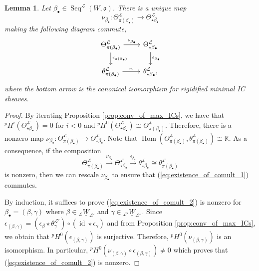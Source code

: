 \documentclass{amsart}
\newcommand{\K}{\mathbb{K}}
\newcommand{\scrL}{\mathcal{L}}
\DeclareMathOperator{\Hom}{Hom}
\DeclareMathOperator{\id}{id}
\newcommand{\fr}[1]{\mathfrak{#1}}
\DeclareMathOperator{\Seq}{Seq}
\newcommand{\uW}[2]{{}_{#1}\underline{W}_{#2}}
\newtheorem{lemma}[subsubsection]{Lemma}
\theoremstyle{definition}
\numberwithin{equation}{subsection}
\begin{document}
\begin{lemma}\label{lem:existence_of_comult}
    Let $\beta_{\bullet} \in \Seq^{\scrL} (W, \fr{o})$.
    There is a unique map
    \[\nu_{\beta_{\bullet}} : \Theta^{\scrL}_{\pi (\beta_{\bullet})} \to \Theta^{\scrL}_{\star \beta_{\bullet}}\]
    making the following diagram commute,
    \begin{equation}\label{eq:existence_of_comult_1}
        \begin{tikzcd}
            \Theta^{\scrL}_{\pi (\beta_{\bullet})} \arrow[r, "\nu_{\beta_{\bullet}}"] \arrow[d, "\epsilon_{\pi (\beta_{\bullet})}"] & \Theta^{\scrL}_{\star \beta_{\bullet}} \arrow[d, "\epsilon_{\beta_{\bullet}}"] \\
            \theta^{\scrL}_{\pi (\beta_{\bullet})} \arrow[r, "\sim"]                                                              & \theta^{\scrL}_{\star \beta_{\bullet}},                                        
            \end{tikzcd}
    \end{equation}
    where the bottom arrow is the canonical isomorphism for rigidified minimal IC sheaves.
\end{lemma}
\begin{proof}
    By iterating Proposition \ref{prop:conv_of_max_ICs}, we have that ${}^p H^i (\Theta^{\scrL}_{\star \beta_{\bullet}}) = 0$ for $i < 0$ 
    and ${}^p H^{0} (\Theta^{\scrL}_{\star \beta_{\bullet}}) \cong \Theta^{\scrL}_{\pi (\beta_{\bullet})}$.
    Therefore, there is a nonzero map $\nu_{\beta_{\bullet}} : \Theta^{\scrL}_{\pi (\beta_{\bullet})} \to \Theta^{\scrL}_{\star \beta_{\bullet}}$.
    Note that $\Hom (\Theta^{\scrL}_{\pi (\beta_{\bullet})}, \theta^{\scrL}_{\pi (\beta_{\bullet})}) \cong \K$. 
    As a consequence, if the composition
    \begin{equation}\label{eq:existence_of_comult_2}
        \Theta^{\scrL}_{\pi (\beta_{\bullet})} \stackrel{\nu_{\beta_{\bullet}}}{\to} \Theta^{\scrL}_{\star \beta_{\bullet}} \stackrel{\epsilon_{\beta_{\bullet}}}{\to} \theta^{\scrL}_{\star \beta_{\bullet}} \cong \theta^{\scrL}_{\pi (\beta_{\bullet})}
    \end{equation}
    is nonzero, then we can rescale $\nu_{\beta_{\bullet}}$ to ensure that (\ref{eq:existence_of_comult_1}) commutes.

    By induction, it suffices to prove (\ref{eq:existence_of_comult_2}) is nonzero for $\beta_{\bullet} = (\beta, \gamma)$ where $\beta \in \uW{\scrL}{\scrL'}$ and $\gamma \in \uW{\scrL'}{\scrL''}$.
    Since $\epsilon_{(\beta, \gamma)} = (\epsilon_{\beta} \star \theta_{\gamma}^{\scrL'}) \circ (\id \star \epsilon_{\gamma})$ and from Proposition \ref{prop:conv_of_max_ICs}, we obtain that ${}^p H^0 (\epsilon_{(\beta, \gamma)})$ is surjective.
    Therefore, ${}^p H^0 (\nu_{(\beta, \gamma)})$ is an isomorphism. In particular, ${}^p H^0 (\nu_{(\beta, \gamma)} \circ \epsilon_{(\beta, \gamma)} ) \neq 0$ which proves that (\ref{eq:existence_of_comult_2}) is nonzero.
\end{proof}
\end{document}
